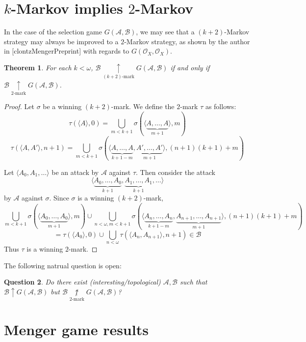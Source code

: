 \documentclass[11pt]{article}
\theoremstyle{plain}
\newtheorem{theorem}{Theorem}
\newtheorem{question}[theorem]{Question}
\theoremstyle{definition}
\theoremstyle{remark}
\theoremstyle{plain}
\theoremstyle{definition}
\theoremstyle{remark}
\newcommand{\win}{\uparrow}
\newcommand{\kmarkwin}[1]{\underset{#1\text{-mark}}{\uparrow}}
\newcommand{\notkmarkwin}[1]{\underset{#1\text{-mark}}{\not\uparrow}}
\newcommand{\sGame}[2]{G(#1,#2)}
\newcommand{\<}{\langle}
\renewcommand{\>}{\rangle}
\newcommand{\mc}[1]{\mathcal{#1}}
\newcommand{\pl}[1]{\mathscr{#1}}
\begin{document}
\section{\(k\)-Markov implies \(2\)-Markov}

In the case of the selection game \(\sGame{\mc A}{\mc B}\), we may see that
a \((k+2)\)-Markov strategy may always be improved to a \(2\)-Markov strategy,
as shown by the author in [clontzMengerPreprint] with regards to
\(\sGame{\mc O_X}{\mc O_X}\).

\begin{theorem}
  For each \(k<\omega\), \(\pl B \kmarkwin{(k+2)} \sGame{\mc A}{\mc B}\)
  if and only if \(\pl B \kmarkwin{2} \sGame{\mc A}{\mc B}\).
\end{theorem}

\begin{proof}
  Let \(\sigma\) be a winning \((k+2)\)-mark. We define the \(2\)-mark
  \(\tau\) as follows:
    \[
      \tau(\<A\>,0)
        =
      \bigcup_{m<k+1}
        \sigma(\<\underbrace{A,\dots,A}_{m+1}\>,m)
    \]
    \[
      \tau(\<A,A'\>,n+1)
        =
      \bigcup_{m<k+1}
        \sigma(\<
          \underbrace{A,\dots,A}_{k+1-m},
          \underbrace{A',\dots,A'}_{m+1}
        \>,(n+1)(k+1)+m)
    \]

  Let \(\<A_0,A_1,\dots\>\) be an attack by \(\pl A\) against \(\tau\).
  Then consider the attack
    \[
      \<
        \underbrace{A_0,\dots,A_0}_{k+1},
        \underbrace{A_1,\dots,A_1}_{k+1},
        \dots
      \>
    \]
  by \(\pl A\) against \(\sigma\). Since \(\sigma\) is a winning \((k+2)\)-mark,
    \[
      \bigcup_{m<k+1}
        \sigma(\<\underbrace{A_0,\dots,A_0}_{m+1}\>,m)
      \cup
      \bigcup_{n<\omega,m<k+1}
        \sigma(\<
          \underbrace{A_n,\dots,A_n}_{k+1-m},
          \underbrace{A_{n+1},\dots,A_{n+1}}_{m+1}
        \>,(n+1)(k+1)+m)
    \]
    \[
      =
      \tau(\<A_0\>,0)
      \cup
      \bigcup_{n<\omega}
      \tau(\<A_n,A_{n+1}\>,n+1)
        \in
      \mc B
    \]
  Thus \(\tau\) is a winning \(2\)-mark.
\end{proof}

The following natrual question is open:

\begin{question}
  Do there exist (interesting/topological) \(\mc A,\mc B\) such that
  \(\pl B\win\sGame{\mc A}{\mc B}\) but
  \(\pl B\notkmarkwin{2}\sGame{\mc A}{\mc B}\)?
\end{question}

\section{Menger game results}
\end{document}
